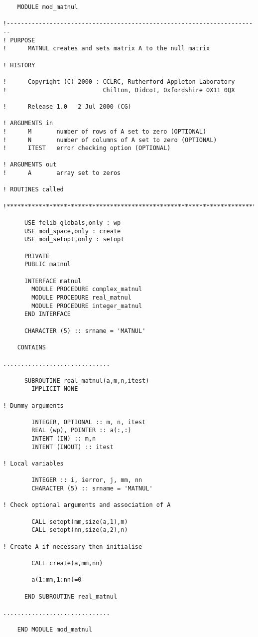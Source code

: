 \begin{verbatim}
    MODULE mod_matnul

!-----------------------------------------------------------------------
! PURPOSE
!      MATNUL creates and sets matrix A to the null matrix

! HISTORY

!      Copyright (C) 2000 : CCLRC, Rutherford Appleton Laboratory
!                           Chilton, Didcot, Oxfordshire OX11 0QX

!      Release 1.0   2 Jul 2000 (CG)

! ARGUMENTS in
!      M       number of rows of A set to zero (OPTIONAL)
!      N       number of columns of A set to zero (OPTIONAL)
!      ITEST   error checking option (OPTIONAL)

! ARGUMENTS out
!      A       array set to zeros

! ROUTINES called

!***********************************************************************

      USE felib_globals,only : wp
      USE mod_space,only : create
      USE mod_setopt,only : setopt
      
      PRIVATE
      PUBLIC matnul

      INTERFACE matnul
        MODULE PROCEDURE complex_matnul
        MODULE PROCEDURE real_matnul
        MODULE PROCEDURE integer_matnul
      END INTERFACE

      CHARACTER (5) :: srname = 'MATNUL'    

    CONTAINS

..............................
     
      SUBROUTINE real_matnul(a,m,n,itest)
        IMPLICIT NONE

! Dummy arguments

        INTEGER, OPTIONAL :: m, n, itest
        REAL (wp), POINTER :: a(:,:)
        INTENT (IN) :: m,n
        INTENT (INOUT) :: itest

! Local variables

        INTEGER :: i, ierror, j, mm, nn
        CHARACTER (5) :: srname = 'MATNUL'

! Check optional arguments and association of A

        CALL setopt(mm,size(a,1),m)
        CALL setopt(nn,size(a,2),n)

! Create A if necessary then initialise

        CALL create(a,mm,nn)

        a(1:mm,1:nn)=0

      END SUBROUTINE real_matnul

..............................

    END MODULE mod_matnul
\end{verbatim}